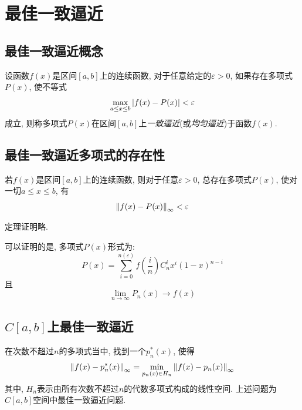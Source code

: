 \section{最佳一致逼近}

\subsection{最佳一致逼近概念}

\begin{definition}
    设函数$f(x)$是区间$[a,b]$上的连续函数, 对于任意给定的$\varepsilon>0$, 如果存在多项式$P(x)$, 使不等式
    \begin{equation*}
        \max_{a\le x\le b}\abs{f(x)-P(x)}<\varepsilon
    \end{equation*}
    成立, 则称多项式$P(x)$在区间$[a,b]$上\emph{一致逼近}(或\emph{均匀逼近})于函数$f(x)$.
\end{definition}

\subsection{最佳一致逼近多项式的存在性}

\begin{theorem}[Weierstrass定理]
    若$f(x)$是区间$[a,b]$上的连续函数, 则对于任意$\varepsilon>0$, 总存在多项式$P(x)$, 使对一切$a\le x\le b$, 有
    \begin{equation*}
        \norm{f(x)-P(x)}_\infty<\varepsilon
    \end{equation*}
\end{theorem}

定理证明略. %

可以证明的是, 多项式$P(x)$形式为:
\begin{equation*}
    P(x)=\sum_{i=0}^{n(\varepsilon)}f\left(\frac{i}{n}\right)C_n^ix^i(1-x)^{n-i}
\end{equation*}
且
\begin{equation*}
    \lim\limits_{n\to\infty}P_n(x)\to f(x)
\end{equation*}

\subsection{$C[a,b]$上最佳一致逼近}

在次数不超过$n$的多项式当中, 找到一个$p_n^*(x)$, 使得
\begin{equation*}
    \norm{f(x)-p_n^*(x)}_\infty=\min_{p_n(x)\in H_n}\norm{f(x)-p_n(x)}_\infty
\end{equation*}
其中, $H_n$表示由所有次数不超过$n$的代数多项式构成的线性空间. 上述问题为$C[a,b]$空间中最佳一致逼近问题.

